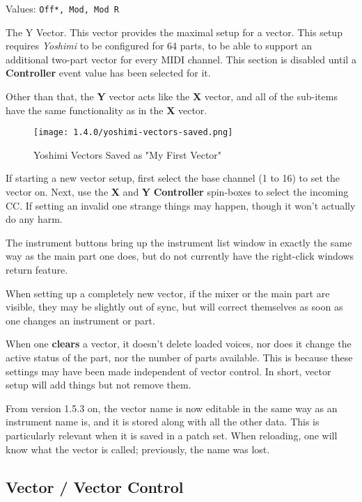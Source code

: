    Values: \texttt{Off*, Mod, Mod R}

   The Y Vector.
   This vector provides the maximal setup for a vector.  This setup requires
   \textsl{Yoshimi} to be configured for 64 parts, to be able to support an
   additional two-part vector for every MIDI channel.  This section is
   disabled until a \textbf{Controller} event value has been selected for it.

   Other than that, the \textbf{Y} vector acts like the \textbf{X} vector, and
   all of the sub-items have the same functionality as in the
   \textbf{X} vector.

\begin{figure}[H]
   \centering
   \texttt{[image: 1.4.0/yoshimi-vectors-saved.png]}
   \caption{Yoshimi Vectors Saved as "My First Vector"}
   \label{fig:yoshimi_vectors_saved}
\end{figure}

   If starting a new vector setup, first
   select the base channel (1 to 16) to set the vector on. Next,
   use the \textbf{X} and \textbf{Y} \textbf{Controller}
   spin-boxes to select the incoming CC.
   If setting an invalid one strange things may happen, though it won't
   actually do any harm.

   The instrument buttons bring up the instrument list window in exactly the
   same way as the main part one does, but do not currently have the
   right-click windows return feature.

   When setting up a completely new vector, if the mixer or the main part are
   visible, they may be slightly out of sync, but will correct themselves as
   soon as one changes an instrument or part.

   When one \textbf{clears} a vector, it doesn't delete loaded voices, nor does
   it change the active status of the part, nor the number of parts available.
   This is because these settings may have been made independent of vector
   control. In short, vector setup will add things but not remove them.

   From version 1.5.3 on, the vector name is now editable in the same way as an
   instrument name is, and it is stored along with all the other data. This is
   particularly relevant when it is saved in a patch set. When reloading, one
   will know what the vector is called; previously, the name was lost.

\subsection{Vector / Vector Control}
\label{subsection:vector_control}

